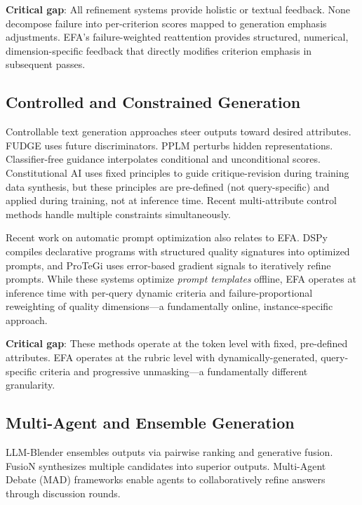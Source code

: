 \documentclass[11pt]{article}
\newcommand{\efa}{\textsc{EFA}}  %
\begin{document}
\textbf{Critical gap}: All refinement systems provide holistic or textual feedback. None decompose failure into per-criterion scores mapped to generation emphasis adjustments. \efa{}'s failure-weighted reattention provides structured, numerical, dimension-specific feedback that directly modifies criterion emphasis in subsequent passes.

\subsection{Controlled and Constrained Generation}

Controllable text generation approaches steer outputs toward desired attributes. FUDGE \citep{yang2021fudge} uses future discriminators. PPLM \citep{dathathri2020plug} perturbs hidden representations. Classifier-free guidance \citep{ho2022classifier} interpolates conditional and unconditional scores. Constitutional AI \citep{bai2022constitutional} uses fixed principles to guide critique-revision during training data synthesis, but these principles are pre-defined (not query-specific) and applied during training, not at inference time. Recent multi-attribute control methods handle multiple constraints simultaneously.

Recent work on automatic prompt optimization also relates to \efa{}. DSPy \citep{khattab2023dspy} compiles declarative programs with structured quality signatures into optimized prompts, and ProTeGi \citep{pryzant2023automatic} uses error-based gradient signals to iteratively refine prompts. While these systems optimize \emph{prompt templates} offline, \efa{} operates at inference time with per-query dynamic criteria and failure-proportional reweighting of quality dimensions---a fundamentally online, instance-specific approach.

\textbf{Critical gap}: These methods operate at the token level with fixed, pre-defined attributes. \efa{} operates at the rubric level with dynamically-generated, query-specific criteria and progressive unmasking---a fundamentally different granularity.

\subsection{Multi-Agent and Ensemble Generation}

LLM-Blender \citep{jiang2023llmblender} ensembles outputs via pairwise ranking and generative fusion. FusioN \citep{agarwal2025fusion} synthesizes multiple candidates into superior outputs. Multi-Agent Debate (MAD) frameworks enable agents to collaboratively refine answers through discussion rounds.
\end{document}
